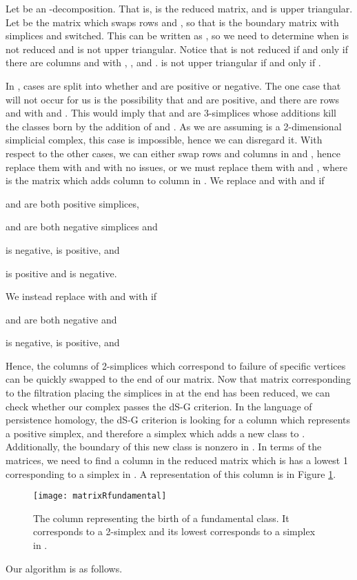 \documentclass[10pt,twocolumn]{article} \usepackage{amsmath,epsf,amssymb,cite,pifont,amsthm, mathrsfs,epsfig,  bbm, amsthm,  setspace}
\renewcommand{\1}{\mathbbm{1}}
\begin{document}
Let  be an -decomposition.
That is,  is the reduced matrix, and  is upper triangular.
Let  be the matrix which swaps rows  and , so that  is the boundary matrix with simplices
 and  switched.
This can be written as , so we need to determine when  is not reduced and
 is not upper triangular.
Notice that  is not reduced if and only if there are columns  and  with
, , and .  is not upper triangular if and only if .



In \cite{Cohen-Steiner2006}, cases are split into whether  and  are positive or negative.
The one case that will not occur for us is the possibility that  and  are positive,
and there are rows  and  with  and .
This would imply that  and  are 3-simplices whose additions kill the classes
born by the addition of  and .
As we are assuming  is a 2-dimensional simplicial complex, this case is impossible, hence we can disregard it.
With respect to the other cases, we can either swap rows and columns in  and ,
hence replace them with  and  with no issues, or we must replace them with 
and , where  is the matrix which adds column  to column  in .
We replace  and  with  and  if
\begin{list}{}{}
\item  and  are both positive simplices,
\item  and  are both negative simplices and 
\item  is negative,  is positive, and \item  is positive and  is negative.
\end{list}
We instead replace  with  and  with  if
\begin{list}{}{}
\item  and  are both negative and  \item  is negative,  is positive, and 
\end{list}
Hence,  the columns of  2-simplices which correspond to failure of specific vertices can be quickly swapped to the end of our matrix.
Now that matrix  corresponding to the filtration placing the simplices in  at the end has been reduced, we can check whether our complex  passes the dS-G criterion.
In the language of persistence homology, the dS-G criterion is looking for a column which represents a positive simplex, and therefore a simplex which adds a new class to  .
Additionally, the boundary of this new class is nonzero in .
In terms of the matrices, we need to find a column  in the reduced matrix  which is   has a lowest 1 corresponding to a simplex in .
A representation of this column is in Figure \ref{F: matrixRfundamental}.
\begin{figure}
\begin{center}
\texttt{[image: matrixRfundamental]}
\end{center}
\caption{The column representing the birth of a fundamental class. It corresponds to a 2-simplex and its lowest
 corresponds to a simplex in .} \label{F: matrixRfundamental}
\end{figure}
Our algorithm is as follows.
\end{document}
